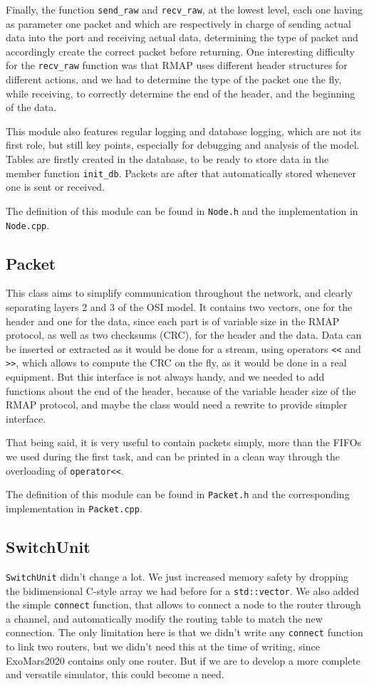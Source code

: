 \documentclass[12pt,a4paper]{article}
\begin{document}
Finally, the function \texttt{send\_raw} and \texttt{recv\_raw}, at the lowest level, each one having as parameter one packet and which are respectively in charge of sending actual data into the port and receiving actual data, determining the type of packet and accordingly create the correct packet before returning. One interesting difficulty for the \texttt{recv\_raw} function was that RMAP uses different header structures for different actions, and we had to determine the type of the packet one the fly, while receiving, to correctly determine the end of the header, and the beginning of the data.\medbreak

This module also features regular logging and database logging, which are not its first role, but still key points, especially for debugging and analysis of the model. Tables are firstly created in the database, to be ready to store data in the member function \texttt{init\_db}. Packets are after that automatically stored whenever one is sent or received.

The definition of this module can be found in \texttt{Node.h} and the implementation in \texttt{Node.cpp}.

\subsection{Packet}
This class aims to simplify communication throughout the network, and clearly separating layers 2 and 3 of the OSI model. It contains two vectors, one for the header and one for the data, since each part is of variable size in the RMAP protocol, as well as two checksums (CRC), for the header and the data. Data can be inserted or extracted as it would be done for a stream, using operators \verb|<<| and \verb|>>|, which allows to compute the CRC on the fly, as it would be done in a real equipment. But this interface is not always handy, and we needed to add functions about the end of the header, because of the variable header size of the RMAP protocol, and maybe the class would need a rewrite to provide simpler interface.

That being said, it is very useful to contain packets simply, more than the FIFOs we used during the first task, and can be printed in a clean way through the overloading of  \verb|operator<<|.

The definition of this module can be found in \texttt{Packet.h} and the corresponding implementation in \texttt{Packet.cpp}.
\subsection{SwitchUnit}
\texttt{SwitchUnit} didn't change a lot. We just increased memory safety by dropping the bidimensional C-style array we had before for a \texttt{std::vector}. We also added the simple \texttt{connect} function, that allows to connect a node to the router through a channel, and automatically modify the routing table to match the new connection. The only limitation here is that we didn't write any \texttt{connect} function to link two routers, but we didn't need this at the time of writing, since ExoMars2020 contains only one router. But if we are to develop a more complete and versatile simulator, this could become a need.
\end{document}
